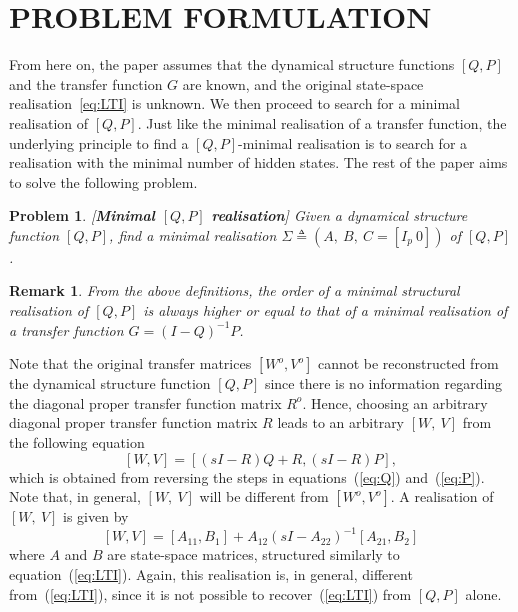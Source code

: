 \documentclass[twocolumn,12pt]{autart}
\theoremstyle{plain}
\newtheorem{remark}{Remark}
\newtheorem{problem}{Problem}
\begin{document}
\section{PROBLEM FORMULATION}\label{se:pf}
From here on, the paper assumes that the dynamical structure functions $[Q,P]$ and the transfer function $G$ are known, and  the original state-space realisation~\eqref{eq:LTI} is unknown. We then proceed to search for a minimal realisation of $[Q,P]$. Just like the minimal realisation of a transfer function, the underlying principle to find a $[{Q},{P}]$-minimal realisation is to search for a realisation with the minimal number of hidden states.  The rest of the paper aims to solve the following problem.

\begin{problem}\label{prob:main}
{\em [}{\bf Minimal $[Q,P]$ realisation}{\em ]} Given a dynamical structure function $[Q,P]$, find a minimal realisation $\Sigma\triangleq(A,~B,~C=[I_p~0])$ of $[Q,P]$. 
\end{problem}

\begin{remark}
From the above definitions, the order of a minimal structural realisation of $[Q,P]$ is always higher or equal to that of a minimal realisation of a transfer function $G=(I-Q)^{-1}P$. 
\end{remark}

Note that the original transfer matrices $[{W}^o, {V}^o]$ cannot be reconstructed from the  dynamical structure function $[{Q},{P}]$ since there is no information regarding the diagonal proper transfer function matrix ${R}^o$. Hence, choosing an arbitrary diagonal proper transfer function matrix ${R}$ leads to an arbitrary $[W,~V]$ from the following equation 
\begin{equation}\label{eq:Rrealization}
[{W},{V}]= [(s{I} - {R}){Q} +{R},(s{I}-{R}){P}],
\end{equation} 
which is obtained from reversing the steps in equations~(\ref{eq:Q}) and~(\ref{eq:P}). Note that, in general, $[W,~V]$ will be different from $[{W}^o, {V}^o]$.
A realisation of $[W,~V]$ is given by
\begin{equation}\label{eq::WVrealization}
  [{W},{V}]=[{A}_{11},{B}_1]+{A}_{12}(s{I}-{A}_{22})^{-1}[{A}_{21},{B}_2]
\end{equation}
where ${A}$ and ${B}$ are state-space matrices, structured similarly to equation~(\ref{eq:LTI}).
Again, this realisation is, in general, different from~(\ref{eq:LTI}), since it is not possible to recover~(\ref{eq:LTI}) from $[{Q},{P}]$ alone.
\end{document}
